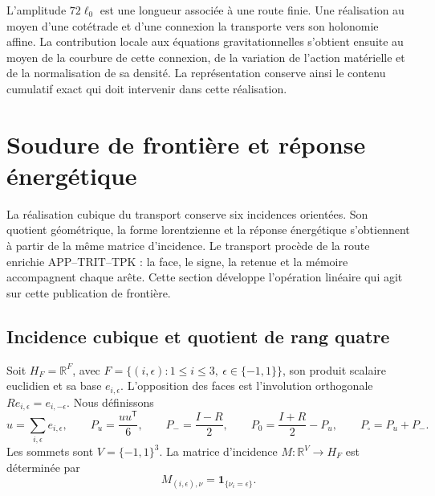 L'amplitude \(72\ell_0\) est une longueur associée à une route finie. Une réalisation au moyen d'une cotétrade et d'une connexion la transporte vers son holonomie affine. La contribution locale aux équations gravitationnelles s'obtient ensuite au moyen de la courbure de cette connexion, de la variation de l'action matérielle et de la normalisation de sa densité. La représentation conserve ainsi le contenu cumulatif exact qui doit intervenir dans cette réalisation.




\chapter{Soudure de frontière et réponse énergétique}
\label{x_reciprocidad:vii:sec:pantalla-respuesta}

La réalisation cubique du transport conserve six incidences orientées.
Son quotient géométrique, la forme lorentzienne et la réponse énergétique
s'obtiennent à partir de la même matrice d'incidence. Le transport procède de
la route enrichie APP--TRIT--TPK : la face, le signe, la retenue et la
mémoire accompagnent chaque arête. Cette section développe
l'opération linéaire qui agit sur cette publication de frontière.

\section{Incidence cubique et quotient de rang quatre}
\label{x_reciprocidad:vii:sec:cociente-pantalla}

Soit \(H_F=\mathbb R^F\), avec
\(F=\{(i,\epsilon):1\leq i\leq3,\ \epsilon\in\{-1,1\}\}\),
son produit scalaire euclidien et sa base \(e_{i,\epsilon}\).
L'opposition des faces est l'involution orthogonale
\(Re_{i,\epsilon}=e_{i,-\epsilon}\). Nous définissons
\[
 u=\sum_{i,\epsilon}e_{i,\epsilon},\qquad
 P_u=\frac{uu^{\mathsf T}}6,\qquad P_-=\frac{I-R}{2},\qquad
 P_0=\frac{I+R}{2}-P_u,\qquad P_\square=P_u+P_-.
\]
Les sommets sont \(V=\{-1,1\}^3\). La matrice d'incidence \(M:\mathbb R^V\longrightarrow H_F\) est déterminée par
\[
 M_{(i,\epsilon),\nu}=\mathbf1_{\{\nu_i=\epsilon\}}.
\]

